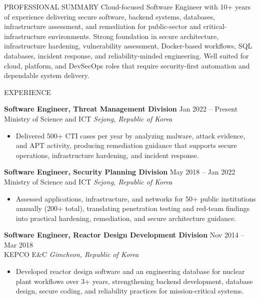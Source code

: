 \documentclass{resume}
\begin{document}
\small

\begin{rSection}{PROFESSIONAL SUMMARY}
Cloud-focused Software Engineer with 10+ years of experience delivering secure software, backend systems, databases, infrastructure assessment, and remediation for public-sector and critical-infrastructure environments. Strong foundation in secure architecture, infrastructure hardening, vulnerability assessment, Docker-based workflows, SQL databases, incident response, and reliability-minded engineering. Well suited for cloud, platform, and DevSecOps roles that require security-first automation and dependable system delivery.
\end{rSection}

\begin{rSection}{EXPERIENCE}

\textbf{Software Engineer, Threat Management Division} \hfill Jan 2022 -- Present\\
Ministry of Science and ICT \hfill \textit{Sejong, Republic of Korea}
\begin{itemize}
    \itemsep -4pt {}
    \item Delivered 500+ CTI cases per year by analyzing malware, attack evidence, and APT activity, producing remediation guidance that supports secure operations, infrastructure hardening, and incident response.
\end{itemize}

\textbf{Software Engineer, Security Planning Division} \hfill May 2018 -- Jan 2022\\
Ministry of Science and ICT \hfill \textit{Sejong, Republic of Korea}
\begin{itemize}
    \itemsep -4pt {}
    \item Assessed applications, infrastructure, and networks for 50+ public institutions annually (200+ total), translating penetration testing and red-team findings into practical hardening, remediation, and secure architecture guidance.
\end{itemize}

\textbf{Software Engineer, Reactor Design Development Division} \hfill Nov 2014 -- Mar 2018\\
KEPCO E\&C \hfill \textit{Gimcheon, Republic of Korea}
\begin{itemize}
    \itemsep -4pt {}
    \item Developed reactor design software and an engineering database for nuclear plant workflows over 3+ years, strengthening backend development, database design, secure coding, and reliability practices for mission-critical systems.
\end{itemize}

\end{rSection}
\end{document}
